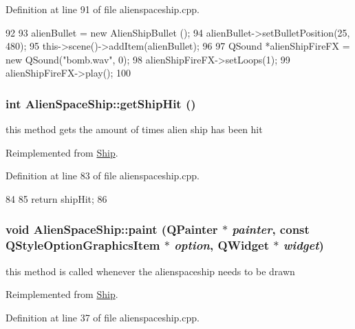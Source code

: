 Definition at line 91 of file alienspaceship.cpp.


\begin{DoxyCode}
92 {
93     alienBullet = new AlienShipBullet ();
94     alienBullet->setBulletPosition(25, 480);
95     this->scene()->addItem(alienBullet);
96 
97     QSound *alienShipFireFX = new QSound("bomb.wav", 0);
98     alienShipFireFX->setLoops(1);
99     alienShipFireFX->play();
100 }
\end{DoxyCode}
\hypertarget{class_alien_space_ship_ab6ff56db6d322e2023611315e53c4895}{
\subsubsection[{getShipHit}]{\setlength{\rightskip}{0pt plus 5cm}int AlienSpaceShip::getShipHit ()}}
\label{class_alien_space_ship_ab6ff56db6d322e2023611315e53c4895}
this method gets the amount of times alien ship has been hit 

Reimplemented from \hyperlink{class_ship_ab8efcfc8f38e0b231b99585846e676c5}{Ship}.

Definition at line 83 of file alienspaceship.cpp.


\begin{DoxyCode}
84 {
85     return shipHit;
86 }
\end{DoxyCode}
\hypertarget{class_alien_space_ship_a463eea8a3dfe340539766da746e168b5}{
\subsubsection[{paint}]{\setlength{\rightskip}{0pt plus 5cm}void AlienSpaceShip::paint (QPainter $\ast$ {\em painter}, \/  const QStyleOptionGraphicsItem $\ast$ {\em option}, \/  QWidget $\ast$ {\em widget})}}
\label{class_alien_space_ship_a463eea8a3dfe340539766da746e168b5}
this method is called whenever the alienspaceship needs to be drawn 

Reimplemented from \hyperlink{class_ship_a1dad980a3b84bb77c63da853ec13477d}{Ship}.

Definition at line 37 of file alienspaceship.cpp.


